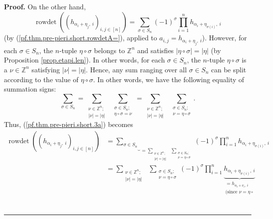 \documentclass
[numbers=enddot,12pt,final,onecolumn,notitlepage,english]{scrartcl}%
\theoremstyle{definition}
\newenvironment{proof}[1][Proof]{\noindent\textbf{#1.} }{\ \rule{0.5em}{0.5em}}
\let\sumnonlimits\sum
\let\prodnonlimits\prod
\renewcommand{\sum}{\sumnonlimits\limits}
\renewcommand{\prod}{\prodnonlimits\limits}
\newenvironment{vershort}{}{}
\begin{document}
\begin{vershort}
\begin{proof}
On the other hand,%
\begin{equation}
\operatorname*{rowdet}\left(  \left(  h_{\alpha_{i}+\eta_{j},\ i}\right)
_{i,j\in\left[  n\right]  }\right)  =\sum_{\sigma\in S_{n}}\left(  -1\right)
^{\sigma}\prod_{i=1}^{n}h_{\alpha_{i}+\eta_{\sigma\left(  i\right)  },\ i}
\label{pf.thm.pre-pieri.short.3a}%
\end{equation}
(by (\ref{pf.thm.pre-pieri.short.rowdetA=}), applied to $a_{i,j}=h_{\alpha
_{i}+\eta_{j},\ i}$). However, for each $\sigma\in S_{n}$, the $n$-tuple
$\eta\circ\sigma$ belongs to $\mathbb{Z}^{n}$ and satisfies $\left\vert
\eta\circ\sigma\right\vert =\left\vert \eta\right\vert $ (by Proposition
\ref{prop.etapi.len}). In other words, for each $\sigma\in S_{n}$, the
$n$-tuple $\eta\circ\sigma$ is a $\nu\in\mathbb{Z}^{n}$ satisfying $\left\vert
\nu\right\vert =\left\vert \eta\right\vert $. Hence, any sum ranging over all
$\sigma\in S_{n}$ can be split according to the value of $\eta\circ\sigma$. In
other words, we have the following equality of summation signs:%
\[
\sum_{\sigma\in S_{n}}=\sum_{\substack{\nu\in\mathbb{Z}^{n};\\\left\vert
\nu\right\vert =\left\vert \eta\right\vert }}\ \ \sum_{\substack{\sigma\in
S_{n};\\\eta\circ\sigma=\nu}}=\sum_{\substack{\nu\in\mathbb{Z}^{n}%
;\\\left\vert \nu\right\vert =\left\vert \eta\right\vert }}\ \ \sum
_{\substack{\sigma\in S_{n};\\\nu=\eta\circ\sigma}}.
\]
Thus, (\ref{pf.thm.pre-pieri.short.3a}) becomes%
\begin{align*}
\operatorname*{rowdet}\left(  \left(  h_{\alpha_{i}+\eta_{j},\ i}\right)
_{i,j\in\left[  n\right]  }\right)   &  =\underbrace{\sum_{\sigma\in S_{n}}%
}_{=\sum_{\substack{\nu\in\mathbb{Z}^{n};\\\left\vert \nu\right\vert
=\left\vert \eta\right\vert }}\ \ \sum_{\substack{\sigma\in S_{n};\\\nu
=\eta\circ\sigma}}}\left(  -1\right)  ^{\sigma}\prod_{i=1}^{n}h_{\alpha
_{i}+\eta_{\sigma\left(  i\right)  },\ i}\\
&  =\sum_{\substack{\nu\in\mathbb{Z}^{n};\\\left\vert \nu\right\vert
=\left\vert \eta\right\vert }}\ \ \sum_{\substack{\sigma\in S_{n};\\\nu
=\eta\circ\sigma}}\left(  -1\right)  ^{\sigma}\prod_{i=1}^{n}%
\underbrace{h_{\alpha_{i}+\eta_{\sigma\left(  i\right)  },\ i}}%
_{\substack{=h_{\alpha_{i}+\nu_{i},\ i}\\\text{(since }\nu=\eta\circ
}}
\end{align*}
\end{proof}
\end{vershort}
\end{document}
